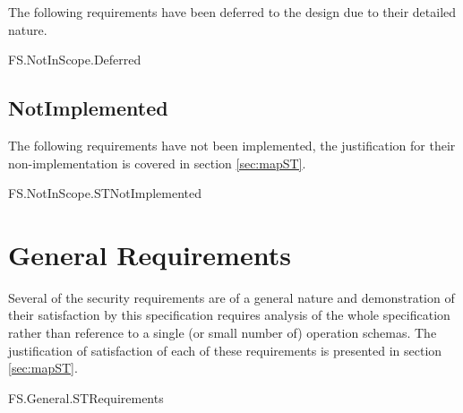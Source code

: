 The following requirements have been deferred to the design due to their
detailed nature.

\begin{traceunit}{FS.NotInScope.Deferred}

\end{traceunit}%

\subsection{NotImplemented}

The following requirements have not been implemented, the
justification for their non-implementation is covered in section \ref{sec:mapST}.

\begin{traceunit}{FS.NotInScope.STNotImplemented}
\end{traceunit}%

\section{General Requirements}
Several of the security requirements are of a general nature and demonstration
of their satisfaction by this specification requires analysis of the
whole specification rather than reference to a single (or small number
of) operation schemas. The justification of satisfaction of each of
these requirements is presented in section \ref{sec:mapST}.

\begin{traceunit}{FS.General.STRequirements}
\end{traceunit}%








